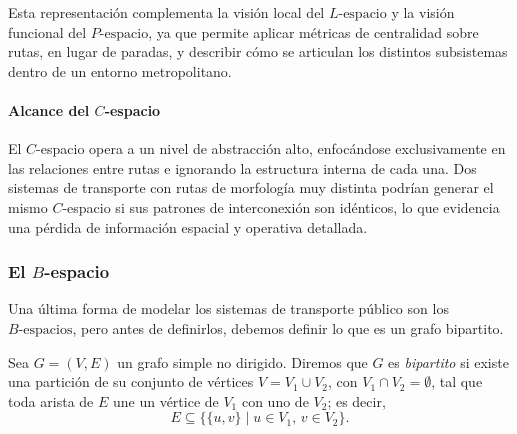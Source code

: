                 Esta representación complementa la visión local del $L\text{-espacio}$ y la visión funcional del $P\text{-espacio}$, ya que permite aplicar métricas de centralidad sobre rutas, en lugar de paradas, y describir cómo se articulan los distintos subsistemas dentro de un entorno metropolitano.

                \paragraph{Alcance del $C$-espacio}
                El $C$-espacio opera a un nivel de abstracción alto, enfocándose exclusivamente en las relaciones entre rutas e ignorando la estructura interna de cada una. Dos sistemas de transporte con rutas de morfología muy distinta podrían generar el mismo $C$-espacio si sus patrones de interconexión son idénticos, lo que evidencia una pérdida de información espacial y operativa detallada.

            \subsubsection{El $B$-espacio}

                Una última forma de modelar los sistemas de transporte público son los $B\text{-espacios}$, pero antes de definirlos, debemos definir lo que es un grafo bipartito.

                \begin{definicion}
                    Sea $G=(V,E)$ un grafo simple no dirigido. Diremos que $G$ es \textit{bipartito} si existe una partición de su conjunto de vértices $V=V_1\cup V_2$, con $V_1\cap V_2=\emptyset$, tal que toda arista de $E$ une un vértice de $V_1$ con uno de $V_2$; es decir,
                    \[
                        E \subseteq \{\{u,v\}\mid u\in V_1,\, v\in V_2\}.
                    \]
                \end{definicion}

